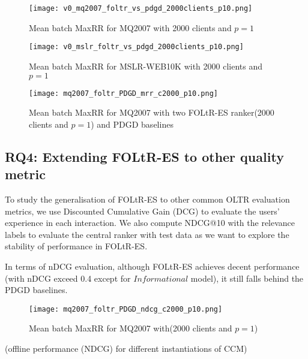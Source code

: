 \begin{figure}[H]
	\centering
	\texttt{[image: v0\_mq2007\_foltr\_vs\_pdgd\_2000clients\_p10.png]}
	\caption{Mean batch MaxRR for MQ2007 with 2000 clients and $p = 1$}
	\label{fig: mq2007-v0-baseline}
\end{figure}

\begin{figure}[H]
	\centering
	\texttt{[image: v0\_mslr\_foltr\_vs\_pdgd\_2000clients\_p10.png]}
	\caption{Mean batch MaxRR for MSLR-WEB10K with 2000 clients and $p = 1$}
	\label{fig: mslr-v0-baseline}
\end{figure}

\begin{figure}[H]
	\centering
	\texttt{[image: mq2007\_foltr\_PDGD\_mrr\_c2000\_p10.png]}
	\caption{Mean batch MaxRR for MQ2007 with two FOLtR-ES ranker(2000 clients and $p = 1$) and PDGD baselines}
	\label{fig: mq2007-rq3}
\end{figure}


\subsection{RQ4: Extending FOLtR-ES to other quality metric}


To study the generalisation of FOLtR-ES to other common OLTR evaluation metrics, we use Discounted Cumulative Gain (DCG) to evaluate the users' experience in each interaction. We also compute NDCG@10 with the relevance labels to evaluate the central ranker with test data as we want to explore the stability of  performance in FOLtR-ES.

In terms of nDCG evaluation, although FOLtR-ES achieves decent performance (with nDCG exceed 0.4 except for $Informational$ model), it still falls behind the PDGD baselines.

\begin{figure}[H]
	\centering
	\texttt{[image: mq2007\_foltr\_PDGD\_ndcg\_c2000\_p10.png]}
	\caption{Mean batch MaxRR for MQ2007 with(2000 clients and $p = 1$)}
	\label{fig: mq2007-rq4}
\end{figure}


(offline performance (NDCG) for different instantiations of CCM)